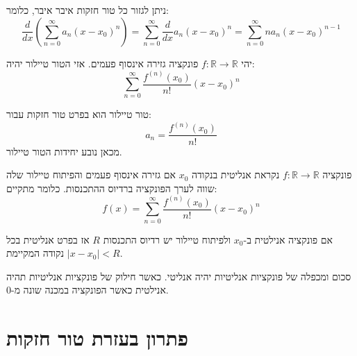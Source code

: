 \documentclass{tstextbook}
\begin{document}
\begin{proposition}
ניתן לגזור כל טור חזקות איבר איבר, כלומר:
$${\frac{d}{d x}}\left(\sum_{n=0}^{\infty}a_{n}\left(x-x_{0}\right)^{n}\right)=\sum_{n=0}^{\infty}{\frac{d}{d x}}a_{n}\left(x-x_{0}\right)^{n}=\sum_{n=0}^{\infty}n a_{n}\left(x-x_{0}\right)^{n-1}$$

\end{proposition}
\begin{definition}
יהי \(f:\mathbb{R}\to \mathbb{R}\) פונקציה גזירה אינסוף פעמים. אזי הטור טיילור יהיה:
$$\sum_{n=0}^{\infty}{\frac{f^{(n)}\left(x_{0}\right)}{n!}}\left(x-x_{0}\right)^{n}$$

\end{definition}
\begin{proposition}
טור טיילור הוא בפרט טור חזקות עבור:
$$a_{n}={\frac{f^{(n)}\left(x_{0}\right)}{n!}}$$
מכאן נובע יחידות הטור טיילור.

\end{proposition}
\begin{definition}
פונקציה \(f:\mathbb{R}\to \mathbb{R}\) נקראת אנליטית בנקודה \(x_{0}\) אם גזירה אינסוף פעמים והפיתוח טיילור שלה שווה לערך הפונקציה ברדיוס ההתכנסות. כלומר מתקיים:
$$f\left(x\right)=\sum_{n=0}^{\infty}{\frac{f^{\left(n\right)}\left(x_{0}\right)}{n!}}\left(x-x_{0}\right)^{n}$$

\end{definition}
\begin{proposition}
אם פונקציה אנילטית ב-\(x_{0}\) ולפיתוח טיילור יש רדיוס התכנסות \(R\) אז בפרט אנליטית בכל נקודה המקיימת \(\lvert x-x_{0} \rvert<R\).

\end{proposition}
\begin{proposition}
סכום ומכפלה של פונקציות אנליטיות יהיה אנליטי. כאשר חילוק של פונקציות אנליטיות תהיה אנילטית כאשר הפונקציה במכנה שונה מ-0.

\end{proposition}
\section{פתרון בעזרת טור חזקות}
\end{document}
